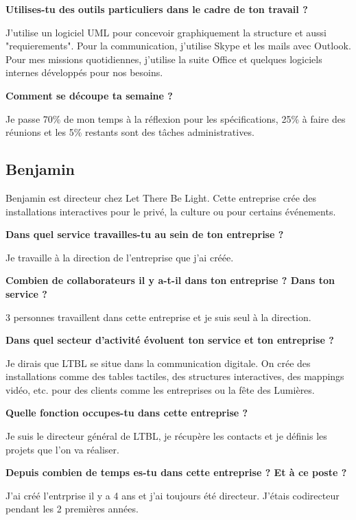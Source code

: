 \documentclass{article}
\newcommand{\question}[1]{\medskip\noindent\textbf{#1}\medskip}
\begin{document}
    \question{Utilises-tu des outils particuliers dans le cadre de ton travail ?}

    J'utilise un logiciel UML pour concevoir graphiquement la structure et aussi "requierements".
    Pour la communication, j'utilise Skype et les mails avec Outlook.
    Pour mes missions quotidiennes, j'utilise la suite Office et quelques logiciels internes développés pour nos besoins.

    \question{Comment se découpe ta semaine ?}

    Je passe 70\% de mon temps à la réflexion pour les spécifications, 25\% à faire des réunions et les 5\% restants sont des tâches administratives.

    \clearpage

    \subsection{Benjamin }

    Benjamin est directeur chez Let There Be Light.
    Cette entreprise crée des installations interactives pour le privé, la culture ou pour certains événements.

    \question{Dans quel service travailles-tu au sein de ton entreprise ?}

    Je travaille à la direction de l'entreprise que j'ai créée.

    \question{Combien de collaborateurs il y a-t-il dans ton entreprise ? Dans ton service ?}

    3 personnes travaillent dans cette entreprise et je suis seul à la direction.

    \question{Dans quel secteur d'activité évoluent ton service et ton entreprise ?}

    Je dirais que LTBL se situe dans la communication digitale.
    On crée des installations comme des tables tactiles, des structures interactives, des mappings vidéo, etc. pour des clients comme les entreprises ou la fête des Lumières.

    \question{Quelle fonction occupes-tu dans cette entreprise ?}

    Je suis le directeur général de LTBL, je récupère les contacts et je définis les projets que l'on va réaliser.

    \question{Depuis combien de temps es-tu dans cette entreprise ? Et à ce poste ?}

    J'ai créé l'entrprise il y a 4 ans et j'ai toujours été directeur.
    J'étais codirecteur pendant les 2 premières années.
\end{document}
